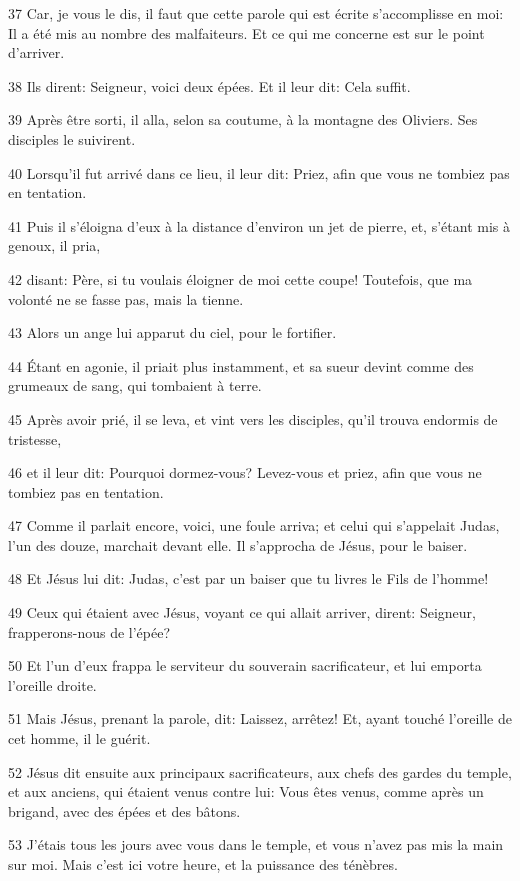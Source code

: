 \par 37 Car, je vous le dis, il faut que cette parole qui est écrite s'accomplisse en moi: Il a été mis au nombre des malfaiteurs. Et ce qui me concerne est sur le point d'arriver.
\par 38 Ils dirent: Seigneur, voici deux épées. Et il leur dit: Cela suffit.
\par 39 Après être sorti, il alla, selon sa coutume, à la montagne des Oliviers. Ses disciples le suivirent.
\par 40 Lorsqu'il fut arrivé dans ce lieu, il leur dit: Priez, afin que vous ne tombiez pas en tentation.
\par 41 Puis il s'éloigna d'eux à la distance d'environ un jet de pierre, et, s'étant mis à genoux, il pria,
\par 42 disant: Père, si tu voulais éloigner de moi cette coupe! Toutefois, que ma volonté ne se fasse pas, mais la tienne.
\par 43 Alors un ange lui apparut du ciel, pour le fortifier.
\par 44 Étant en agonie, il priait plus instamment, et sa sueur devint comme des grumeaux de sang, qui tombaient à terre.
\par 45 Après avoir prié, il se leva, et vint vers les disciples, qu'il trouva endormis de tristesse,
\par 46 et il leur dit: Pourquoi dormez-vous? Levez-vous et priez, afin que vous ne tombiez pas en tentation.
\par 47 Comme il parlait encore, voici, une foule arriva; et celui qui s'appelait Judas, l'un des douze, marchait devant elle. Il s'approcha de Jésus, pour le baiser.
\par 48 Et Jésus lui dit: Judas, c'est par un baiser que tu livres le Fils de l'homme!
\par 49 Ceux qui étaient avec Jésus, voyant ce qui allait arriver, dirent: Seigneur, frapperons-nous de l'épée?
\par 50 Et l'un d'eux frappa le serviteur du souverain sacrificateur, et lui emporta l'oreille droite.
\par 51 Mais Jésus, prenant la parole, dit: Laissez, arrêtez! Et, ayant touché l'oreille de cet homme, il le guérit.
\par 52 Jésus dit ensuite aux principaux sacrificateurs, aux chefs des gardes du temple, et aux anciens, qui étaient venus contre lui: Vous êtes venus, comme après un brigand, avec des épées et des bâtons.
\par 53 J'étais tous les jours avec vous dans le temple, et vous n'avez pas mis la main sur moi. Mais c'est ici votre heure, et la puissance des ténèbres.
